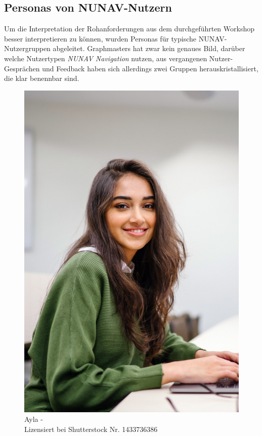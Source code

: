 \subsection{Personas von NUNAV-Nutzern}
\label{sec:06_model_evaluation:personas}

Um die Interpretation der Rohanforderungen aus dem durchgeführten Workshop besser interpretieren zu können, wurden Personas für typische NUNAV-Nutzergruppen abgeleitet. Graphmasters hat zwar kein genaues Bild, darüber welche Nutzertypen \textit{NUNAV Navigation} nutzen, aus vergangenen Nutzer-Gesprächen und Feedback haben sich allerdings zwei Gruppen herauskristallisiert, die klar benennbar sind.

\begin{figure}
    \vspace{-\intextsep}
    \centering
    \includegraphics[width=\textwidth]{contents/06_model_evaluation/01_integration/res/persona_picture_ayla.png}
    \caption{Ayla -\\Lizensiert bei Shutterstock Nr. 1433736386}
\end{figure}

